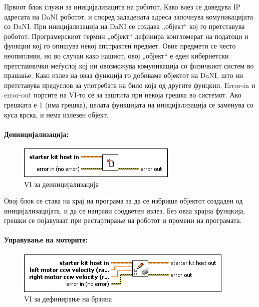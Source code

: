 \documentclass{article}
\begin{document}
Првиот блок служи за иницијализацита на роботот. Како влез се доведува IP адресата на DaNI роботот, и според зададената адреса започнува комуникацијата со DaNI. При иницијализација на DaNI се создава „објект“ кој го претставува роботот. Програмерскиот термин „објект“ дефинира конгломерат на податоци и функции коj го опишува некој апстрактен предмет. Овие предмети се често неопипливи, но во случаи како нашиот, овој „објект“ е еден кибернетски претставнички меѓуслој кој ни овозможува комуникација со физичкиот систем во прашање. Како излез на оваа функција го добиваме објектот на DaNI, што ни претставува предуслов за употребата на било која од другите фунцкии. Error-in и error-out портите на VI-то се за заштита при некоја грешка во системот. Ако грешката е 1 (има грешка), целата функцијата на иницијализација се заменува со куса врска, и нема излезен објект. \\

\paragraph{Деиницијализација:\\}
\begin{figure}[h]  
\includegraphics[width = 0.45\linewidth]{deinit.png}
\raggedright
\caption{VI за деиницијализација}
\label{fig:deinit.png}
\end{figure}
Овој блок се става на крај на програма за да се избрише објектот создаден од иницијализацијата, и да се направи соодветен излез. Без оваа крајна фунцкија, грешки се појавуваат при рестартирање на роботот и промени на програмата. 
\\

\paragraph{Управување на моторите:\\}
\begin{figure}[h]
\includegraphics[width=0.45\linewidth]{write_dc.png}
\raggedright
\caption{VI за дефинирање на брзина}
\label{fig:write_dc.png}
\end{figure}
\end{document}
